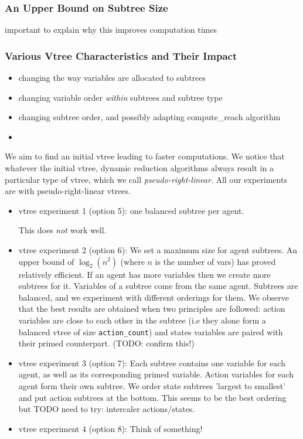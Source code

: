\documentclass[11pt]{article}
\begin{document}
\subsubsection{An Upper Bound on Subtree Size}

important to explain why this improves computation times
\subsubsection{Various Vtree Characteristics and Their Impact}

\begin{itemize}
\item changing the way variables are allocated to subtrees
\item changing variable order \textit{within} subtrees and subtree type
\item changing subtree order, and possibly adapting compute\_reach algorithm
\item 

\end{itemize}

We aim to find an initial vtree leading to faster computations. We notice that whatever the initial vtree, dynamic reduction algorithms always result in a particular type of vtree, which we call \textit{pseudo-right-linear}. 
All our experiments are with pseudo-right-linear vtrees.
\begin{itemize}
\item vtree experiment 1 (option 5): one balanced subtree per agent. 

This does \textit{not} work well.
\item vtree experiment 2 (option 6): We set a maximum size for agent subtrees. An upper bound of $\log_2(n^2)$ (where $n$ is the number of vars) has proved relatively efficient. If an agent has more variables then we create more subtrees for it. Variables of a subtree come from the same agent. Subtrees are balanced, and we experiment with different orderings for them. We observe that the best results are obtained when two principles are followed: action variables are close to each other in the subtree (i.e they alone form a balanced vtree of size \texttt{action\_count}) and states variables are 
paired with their primed counterpart. (TODO: confirm this!)

\item vtree experiment 3 (option 7): Each subtree contains one variable for each agent, as well as its corresponding primed variable. Action variables for each agent form their own subtree. We order state subtrees 'largest to smallest' and put action subtrees at the bottom. This seems to be the best ordering but TODO need to try: intercaler actions/states.

\item vtree experiment 4 (option 8): Think of something! 

\end{itemize}
\end{document}
